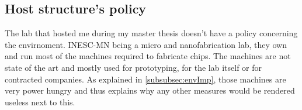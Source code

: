 \subsection{Host structure's policy}

The lab that hosted me during my master thesis doesn't have a policy concerning the envirnoment. \ac{INESC}-MN being a micro and nanofabrication lab, they own and run most of the machines required to fabricate chips. The machines are not state of the art and mostly used for prototyping, for the lab itself or for contracted companies. As explained in \cref{subsubsec:envImp}, those machines are very power hungry and thus explains why any other measures would be rendered useless next to this.
